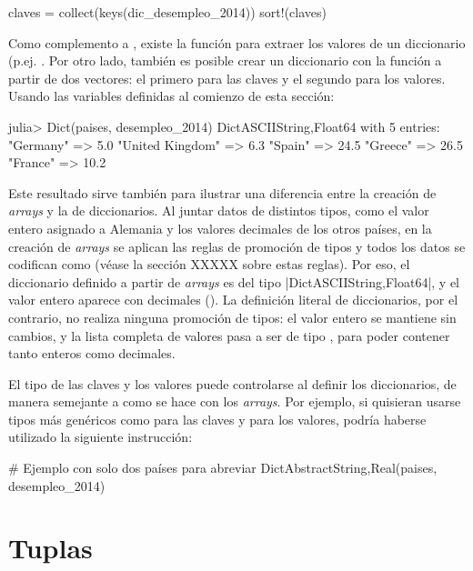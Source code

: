 {\begin{juliacode}
claves = collect(keys(dic_desempleo_2014))
sort!(claves)
\end{juliacode}

Como complemento a , existe la función  para extraer los valores de un diccionario (p.ej. . Por otro lado, también es posible crear un diccionario con la función  a partir de dos vectores: el primero para las claves y el segundo para los valores. Usando las variables definidas al comienzo de esta sección:

\begin{jlconcode}
julia> Dict(paises, desempleo_2014)
Dict{ASCIIString,Float64} with 5 entries:
  "Germany"        => 5.0
  "United Kingdom" => 6.3
  "Spain"          => 24.5
  "Greece"         => 26.5
  "France"         => 10.2
\end{jlconcode}

Este resultado sirve también para ilustrar una diferencia entre la creación de \emph{arrays} y la de diccionarios. Al juntar datos de distintos tipos, como el valor entero  asignado a Alemania y los valores decimales de los otros países, en la creación de \emph{arrays} se aplican las reglas de promoción de tipos y todos los datos se codifican como  (véase la sección XXXXX sobre estas reglas). Por eso, el diccionario definido a partir de \emph{arrays} es del tipo \code|Dict{ASCIIString,Float64}|, y el valor entero aparece con decimales (). La definición literal de diccionarios, por el contrario, no realiza ninguna promoción de tipos: el valor entero se mantiene sin cambios, y la lista completa de valores pasa a ser de tipo , para poder contener tanto enteros como decimales.

El tipo de las claves y los valores puede controlarse al definir los diccionarios, de manera semejante a como se hace con los \emph{arrays}. Por ejemplo, si quisieran usarse tipos más genéricos como  para las claves y  para los valores, podría haberse utilizado la siguiente instrucción:

\begin{juliacode}
# Ejemplo con solo dos países para abreviar
Dict{AbstractString,Real}(paises, desempleo_2014)
\end{juliacode}


\section{Tuplas}

}

